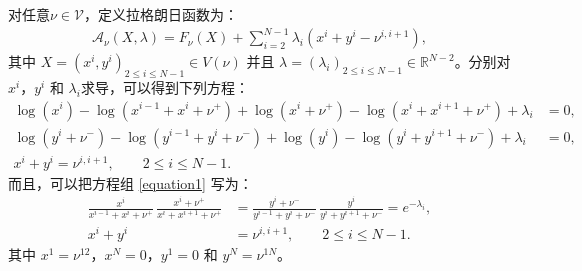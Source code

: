 对任意$\nu\in\mathcal{V}$，定义拉格朗日函数为：
\begin{align*}
    \mathcal{A}_{\nu}(X,\lambda) = F_{\nu}(X) + \sum_{i=2}^{N-1} \lambda_i \left(x^{i} + y^{i} - \nu^{i,i+1}\right),
\end{align*}
其中 $X=(x^i,y^i)_{2\le i\le N-1}\in V(\nu)$ 并且 $\lambda=(\lambda_i)_{2\le i\le N-1}\in \mathbb{R}^{N-2}$。分别对 $x^{i}$，$y^{i}$ 和 $\lambda_i$求导，可以得到下列方程：
\begin{equation}\label{equation1}
	\begin{split}
		\log\left(x^{i}\right) - \log\left(x^{i-1}+x^{i}+\nu^{+}\right)  + \log\left(x^{i}+\nu^{+}\right) -\log\left(x^{i}+x^{i+1}+\nu^{+}\right)+\lambda_i  &= 0, \\
		\log\left(y^{i}+\nu^{-}\right) -\log\left(y^{i-1}+y^{i}+\nu^{-}\right)  + \log\left(y^{i}\right) - \log\left(y^{i}+y^{i+1}+\nu^{-}\right) +\lambda_i &= 0, \\
		x^{i} + y^{i} = \nu^{i,i+1},\qquad 2\le i\le N-1.\qquad\qquad\qquad
	\end{split}
\end{equation}
而且，可以把方程组 \eqref{equation1} 写为：
\begin{equation}\label{equations}
    \begin{split}
    \frac{x^{i}}{x^{i-1}+x^{i}+\nu^+}
    \,\frac{x^{i}+\nu^+}{x^{i}+x^{i+1}+\nu^+}
    &= \frac{y^{i}+\nu^-}{y^{i-1}+y^{i}+\nu^-}
    \,\frac{y^{i}}{y^{i}+y^{i+1}+\nu^-}=e^{-\lambda_i},\\
    x^{i} + y^{i} &= \nu^{i,i+1},\qquad 2\le i\le N-1.
    \end{split}
\end{equation}
其中 $x^1=\nu^{12}$，$x^N=0$，$y^1=0$ 和 $y^N=\nu^{1N}$。

